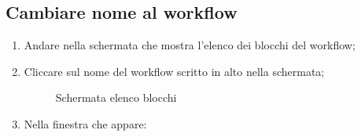 \subsection{Cambiare nome al workflow}
\begin{enumerate}
	\item Andare nella schermata che mostra l'elenco dei blocchi del workflow;
	\item Cliccare sul nome del workflow scritto in alto nella schermata;
	\begin{figure}[!ht]
		\centering
		\caption{Schermata elenco blocchi}
	\end{figure}
	\item Nella finestra che appare:

\end{enumerate}
